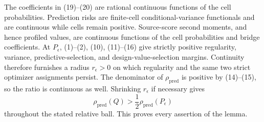 The coefficients in (19)--(20) are rational continuous functions of the cell probabilities.  Prediction risks are finite-cell conditional-variance functionals and are continuous while cells remain positive.  Source-score second moments, and hence profiled values, are continuous functions of the cell probabilities and bridge coefficients.  At \(P_\epsilon\), (1)--(2), (10), (11)--(16) give strictly positive regularity, variance, predictive-selection, and design-value-selection margins.  Continuity therefore furnishes a radius \(r_\epsilon>0\) on which regularity and the same two strict optimizer assignments persist.  The denominator of \(\rho_{\mathrm{pred}}\) is positive by (14)--(15), so the ratio is continuous as well.  Shrinking \(r_\epsilon\) if necessary gives
\[
 \rho_{\mathrm{pred}}(Q)>\frac12\rho_{\mathrm{pred}}(P_\epsilon)
\]
throughout the stated relative ball.  This proves every assertion of the lemma.